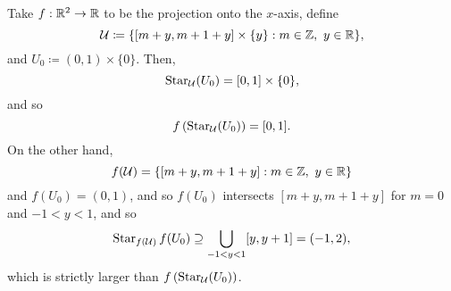 \begin{exm}
Take $f:\mathbb{R} ^2\rightarrow \mathbb{R}$ to be the projection onto the $x$-axis, define
\begin{equation}
\mathcal{U}\coloneqq \{ [m+y,m+1+y]\times \{ y\} :m\in \mathbb{Z} ,\ y\in \mathbb{R} \} ,
\end{equation}
and $U_0\coloneqq (0,1)\times \{ 0\}$.  Then,
\begin{equation}
\operatorname{Star}_{\mathcal{U}}(U_0)=[0,1]\times \{ 0\} ,
\end{equation}
and so
\begin{equation}
f\left( \operatorname{Star} _{\mathcal{U}}(U_0)\right) =[0,1].
\end{equation}
On the other hand,
\begin{equation}
f(\mathcal{U})=\{ [m+y,m+1+y]:m\in \mathbb{Z} ,\ y\in \mathbb{R} \} 
\end{equation}
and $f(U_0)=(0,1)$, and so $f(U_0)$ intersects $[m+y,m+1+y]$ for $m=0$ and $-1<y<1$, and so
\begin{equation}
\operatorname{Star} _{f(\mathcal{U})}f(U_0)\supseteq \bigcup _{-1<y<1}[y,y+1]=(-1,2),
\end{equation}
which is strictly larger than $f\left( \operatorname{Star} _{\mathcal{U}}(U_0)\right)$.
\end{exm}

